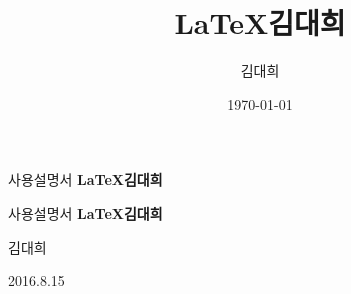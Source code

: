 \documentclass[12pt, a4paper, oneside]{book}
\begin{document}
	
			\noptcrule 	%
			\dominitoc 		
			\doparttoc
			\dopartlof
			\dopartlot
			
			

		\begin{titlepage}
			\centering
			\null
			\vspace{2cm}
			{사용설명서 \huge\bfseries \LaTeX 김대희} \par
			
		\end{titlepage}
		\newpage
		\thispagestyle{empty}
	
	
		\clearpage
		\begin{titlepage}
			\centering
			\null
			\vspace{2cm}
			{사용설명서 \huge\bfseries \LaTeX 김대희} \par
			\vspace{2cm}
			{\Large 김대희\par}
			\vfill
			{\large 2016.8.15 \par}
			\vspace{2cm}
		\end{titlepage}
		\newpage
		\thispagestyle{empty}



		\title{\LaTeX 김대희}
		\author{김대희}
		\date{\today}
		\maketitle
\end{document}
